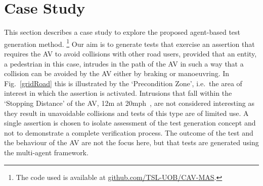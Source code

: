 \documentclass[letterpaper, 10 pt, journal, twoside]{IEEEtran}
\begin{document}
\section{Case Study} \label{s:case-study}
 
This section describes a case study to explore the proposed agent-based test generation method.%
\footnote{The code used is available at \url{github.com/TSL-UOB/CAV-MAS}.} %
%
Our aim is to generate tests that exercise an assertion that requires the AV to avoid collisions with other road users, provided that an entity, a pedestrian in this case, intrudes in the path of the AV in such a way that a collision can be avoided by the AV either by braking or manoeuvring. In Fig.~\ref{gridRoad} this is illustrated by the `Precondition Zone', i.e.\ the area of interest in which the assertion is activated.
%
Intrusions that fall within the `Stopping Distance' of the AV, 12m at 20mph~\cite{codes2015highway}, are not considered interesting as they result in unavoidable collisions and tests of this type are of limited use. 
%
%
A single assertion is chosen to isolate assessment of the test generation concept and not to demonstrate a complete verification process. %
%
The outcome of the test and the behaviour of the AV are not the focus here, but that tests are generated using the multi-agent framework.  %

\end{document}
